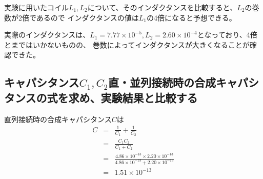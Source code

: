 \documentclass[dvipdfmx]{jsarticle}
\begin{document}
実験に用いたコイル$L_1, L_2$について、そのインダクタンスを比較すると、$L_2$の巻数が2倍であるので
インダクタンスの値は$L_1$の4倍になると予想できる。

実際のインダクタンスは、$L_1 = 7.77\times 10^{-5}, L_2 = 2.60 \times 10^{-4}$となっており、4倍とまではいかないものの、
巻数によってインダクタンスが大きくなることが確認できた。

\subsection{キャパシタンス$C_1, C_2$直・並列接続時の合成キャパシタンスの式を求め、実験結果と比較する}
直列接続時の合成キャパシタンス$C$は
\begin{eqnarray*}
  C & = &\frac{1}{C_1} + \frac{1}{C_2}\\
  & = &\frac{C_1 C_2}{C_1 + C_2}\\
  & = &\frac{4.86 \times 10^{-13} \times 2.20 \times 10^{-13} }{4.86 \times 10^{-13} + 2.20 \times 10^{-13} }\\
  & = &1.51 \times 10^{-13}
\end{eqnarray*}
\end{document}
